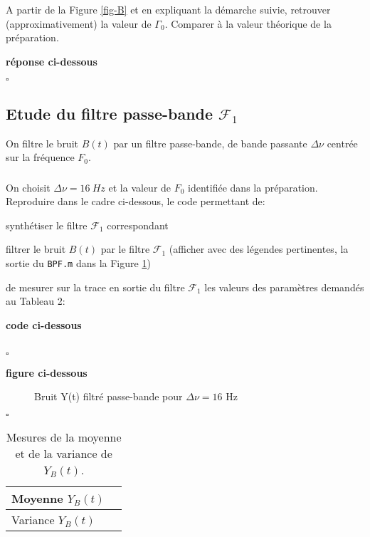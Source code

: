 \documentclass{article}
\newcommand{\dnu}{16}
\newcommand{\debutrep}[1]{\color{blue}\begin{center} \hrulefill \textbf{ #1 } \hrulefill \end{center} }
\newcommand{\finrep}{\vspace*{5mm}\hfill $\square$\color{black}\vspace*{5mm}}
\begin{document}
A partir  de la Figure \ref{fig-B} et en expliquant la démarche suivie, retrouver (approximativement) la valeur de $\Gamma_0$. Comparer à la valeur théorique de la préparation.

\debutrep{réponse ci-dessous}

\finrep

\subsection{Etude du filtre passe-bande $\mathcal{F}_1$}
\label{sec:bruit-passe-bande}

On filtre le bruit $B(t)$ par un filtre passe-bande, de bande passante  $\Delta\nu$ centrée sur  la fréquence  $F_0$. 

\subsubsection{}

On choisit $\Delta\nu = \dnu~Hz$ et la valeur de $F_0$ identifiée dans la préparation.  \\
Reproduire dans le cadre ci-dessous, le code permettant de:
\begin{list}{-}{\setlength{\leftmargin}{3mm} \setlength{\labelwidth}{20mm} \setlength{\labelsep}{2mm} \setlength{\itemsep}{1mm} }
\item synthétiser le filtre $\mathcal{F}_1$ correspondant
\item filtrer le bruit $B(t)$ par le filtre $\mathcal{F}_1$ (afficher avec des légendes pertinentes, la sortie du {\tt BPF.m} dans la Figure \ref{fig-Y}) 
\item de mesurer sur la trace en sortie du filtre $\mathcal{F}_1$ les valeurs des paramètres demandés au Tableau 2:
\end{list}

\debutrep{code ci-dessous}
\begin{verbatim}

\end{verbatim}
\finrep

\debutrep{figure ci-dessous}
\begin{figure}[h]

 \caption{Bruit Y(t) filtré passe-bande pour $\Delta\nu = \dnu$ Hz}
 \label{fig-Y}
\end{figure}
\finrep

\begin{table}[t]
\begin{center}
\begin{tabular}{| L{40mm} | C{40mm}|}\hline
Moyenne $Y_{B}(t)$ 	&  	\\[5mm] \hline
Variance $Y_{B}(t)$ 	&   	\\[5mm] \hline
\end{tabular}
\end{center}
\caption{Mesures de la moyenne et de la variance de $Y_{B}(t)$.}
\label{table-YB}
\end{table}
\end{document}
